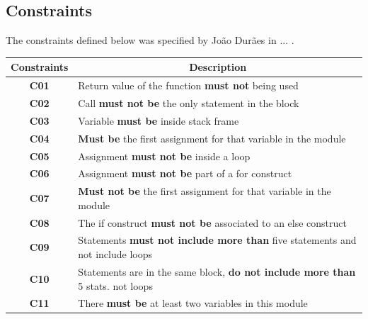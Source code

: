 \subsection{Constraints}

The constraints defined below was specified by João Durães in ... .

\begin{table}[!ht]
\centering
\begin{tabular}{|c|p{12cm}|}
\hline
\textbf{Constraints}            & \multicolumn{1}{c|}{\textbf{Description}}                                     \\ \hline \hline
\textbf{C01}       \label{C01}  & Return value of the function \textbf{must not} being used                              \\ \hline
\textbf{C02}       \label{C02}  & Call \textbf{must not be} the only statement in the block                              \\ \hline
\textbf{C03}       \label{C03}  & Variable \textbf{must be} inside stack frame                                           \\ \hline
\textbf{C04}       \label{C04}  & \textbf{Must be} the first assignment for that variable in the module                  \\ \hline
\textbf{C05}       \label{C05}  & Assignment \textbf{must not be} inside a loop                                          \\ \hline
\textbf{C06}       \label{C06}  & Assignment \textbf{must not be} part of a for construct                                \\ \hline
\textbf{C07}       \label{C07}  & \textbf{Must not be} the first assignment for that variable in the module              \\ \hline
\textbf{C08}       \label{C08}  & The if construct \textbf{must not be} associated to an else construct                  \\ \hline
\textbf{C09}       \label{C09}  & Statements \textbf{must not include more than} five statements and not include loops   \\ \hline
\textbf{C10}       \label{C010} & Statements are in the same block, \textbf{do not include more than} 5 stats. not loops \\ \hline
\textbf{C11}       \label{C011} & There \textbf{must be} at least two variables in this module                           \\ \hline
\end{tabular}
\end{table}

